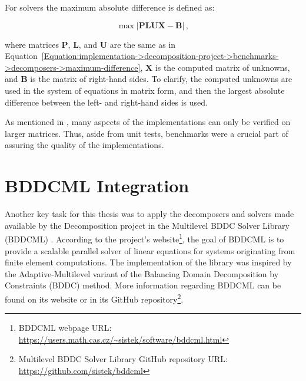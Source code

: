 For solvers the maximum absolute difference is defined as:

\begin{equation}
	\max \left| \mathbf{PLUX} - \mathbf{B} \right| \,,
	\label{Equation:implementation->decomposition-project->benchmarks->solvers->maximum-difference}
\end{equation}

where matrices $\mathbf{P}$, $\mathbf{L}$, and $\mathbf{U}$ are the same as in Equation~\ref{Equation:implementation->decomposition-project->benchmarks->decomposers->maximum-difference}, $\mathbf{X}$ is the computed matrix of unknowns, and $\mathbf{B}$ is the matrix of right-hand sides. To clarify, the computed unknowns are used in the system of equations in matrix form, and then the largest absolute difference between the left- and right-hand sides is used.

As mentioned in  \cite{Cejka2022}, many aspects of the implementations can only be verified on larger matrices. Thus, aside from unit tests, benchmarks were a crucial part of assuring the quality of the implementations.




\section{BDDCML Integration}\label{Section:implementation->BDDCML}
Another key task for this thesis was to apply the decomposers and solvers made available by the Decomposition project in the Multilevel BDDC Solver Library (BDDCML) \cite{Sistek2011, Sistek2012, Sousedik2013, Sistek2015}. According to the project's website\footnote{\label{Footnote:implementation->BDDCML-integration->BDDCML-webpage}BDDCML webpage URL: \url{https://users.math.cas.cz/~sistek/software/bddcml.html}}, the goal of BDDCML is to provide a scalable parallel solver of linear equations for systems originating from finite element computations. The implementation of the library was inspired by the Adaptive-Multilevel variant of the Balancing Domain Decomposition by Constraints (BDDC) method. More information regarding BDDCML can be found on its website or in its GitHub repository\footnote{Multilevel BDDC Solver Library GitHub repository URL: \url{https://github.com/sistek/bddcml}}.

